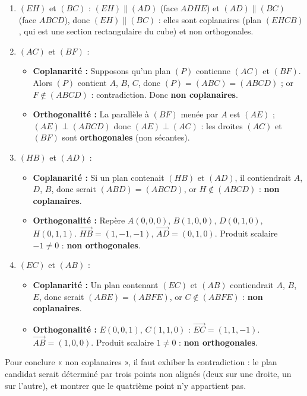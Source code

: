 \documentclass[11pt]{article}
\begin{document}
\begin{corrige}
\begin{enumerate}
\item $(EH)$ et $(BC)$ : $(EH) \parallel (AD)$ (face $ADHE$) et $(AD) \parallel (BC)$ (face $ABCD$), donc $(EH) \parallel (BC)$ : elles sont coplanaires (plan $(EHCB)$, qui est une section rectangulaire du cube) et non orthogonales.
\item $(AC)$ et $(BF)$ : 
  \begin{itemize}
  \item \textbf{Coplanarité :} Supposons qu'un plan $(P)$ contienne $(AC)$ et $(BF)$. Alors $(P)$ contient $A$, $B$, $C$, donc $(P) = (ABC) = (ABCD)$ ; or $F \notin (ABCD)$ : contradiction. Donc \textbf{non coplanaires}.
  \item \textbf{Orthogonalité :} La parallèle à $(BF)$ menée par $A$ est $(AE)$ ; $(AE) \perp (ABCD)$ donc $(AE) \perp (AC)$ : les droites $(AC)$ et $(BF)$ sont \textbf{orthogonales} (non sécantes).
  \end{itemize}
\item $(HB)$ et $(AD)$ : 
  \begin{itemize}
  \item \textbf{Coplanarité :} Si un plan contenait $(HB)$ et $(AD)$, il contiendrait $A$, $D$, $B$, donc serait $(ABD) = (ABCD)$, or $H \notin (ABCD)$ : \textbf{non coplanaires}.
  \item \textbf{Orthogonalité :} Repère $A(0,0,0)$, $B(1,0,0)$, $D(0,1,0)$, $H(0,1,1)$. $\overrightarrow{HB}=(1,-1,-1)$, $\overrightarrow{AD}=(0,1,0)$. Produit scalaire $-1 \neq 0$ : \textbf{non orthogonales}.
  \end{itemize}
\item $(EC)$ et $(AB)$ : 
  \begin{itemize}
  \item \textbf{Coplanarité :} Un plan contenant $(EC)$ et $(AB)$ contiendrait $A$, $B$, $E$, donc serait $(ABE) = (ABFE)$, or $C \notin (ABFE)$ : \textbf{non coplanaires}.
  \item \textbf{Orthogonalité :} $E(0,0,1)$, $C(1,1,0)$ : $\overrightarrow{EC}=(1,1,-1)$. $\overrightarrow{AB}=(1,0,0)$. Produit scalaire $1 \neq 0$ : \textbf{non orthogonales}.
  \end{itemize}
\end{enumerate}
\begin{attention}
Pour conclure « non coplanaires », il faut exhiber la contradiction : le plan candidat serait déterminé par trois points non alignés (deux sur une droite, un sur l'autre), et montrer que le quatrième point n'y appartient pas.
\end{attention}
\end{corrige}
\end{document}
